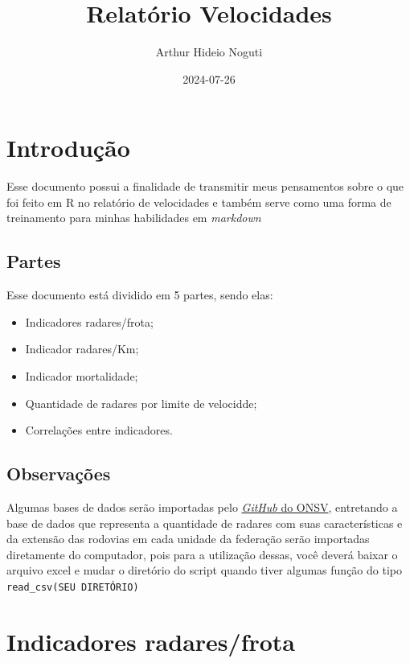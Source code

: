 \documentclass[
]{book}
\title{Relatório Velocidades}
\author{Arthur Hideio Noguti}
\date{2024-07-26}
\providecommand{\tightlist}{%
  \setlength{\itemsep}{0pt}\setlength{\parskip}{0pt}}
\begin{document}
\maketitle

{
\setcounter{tocdepth}{1}
\tableofcontents
}
\chapter{Introdução}\label{intro}

Esse documento possui a finalidade de transmitir meus pensamentos sobre o que foi feito em R no relatório de velocidades e também serve como uma forma de treinamento para minhas habilidades em \emph{markdown}

\section{Partes}\label{partes}

Esse documento está dividido em 5 partes, sendo elas:

\begin{itemize}
\tightlist
\item
  Indicadores radares/frota;\\
\item
  Indicador radares/Km;\\
\item
  Indicador mortalidade;\\
\item
  Quantidade de radares por limite de velocidde;\\
\item
  Correlações entre indicadores.
\end{itemize}

\section{Observações}\label{observauxe7uxf5es}

Algumas bases de dados serão importadas pelo \href{https://github.com/ONSV}{\emph{GitHub} do ONSV}, entretando a base de dados que representa a quantidade de radares com suas características e da extensão das rodovias em cada unidade da federação serão importadas diretamente do computador, pois para a utilização dessas, você deverá baixar o arquivo excel e mudar o diretório do script quando tiver algumas função do tipo \texttt{read\_csv(SEU\ DIRETÓRIO)}

\chapter{Indicadores radares/frota}\label{radar-frota}
\end{document}
